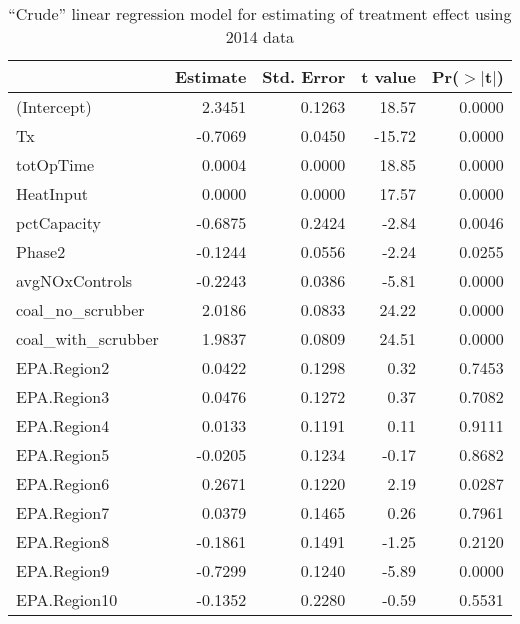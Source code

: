 \begin{table}[ht]
\centering
\begin{tabular}{lrrrr}
  \toprule
                       & Estimate & Std. Error & t value & Pr($>$$|$t$|$) \\ 
  \midrule
(Intercept)            & 2.3451   & 0.1263     & 18.57   & 0.0000         \\  \midrule
  Tx                   & -0.7069  & 0.0450     & -15.72  & 0.0000         \\  \midrule
  totOpTime            & 0.0004   & 0.0000     & 18.85   & 0.0000         \\ 
  HeatInput            & 0.0000   & 0.0000     & 17.57   & 0.0000         \\ 
  pctCapacity          & -0.6875  & 0.2424     & -2.84   & 0.0046         \\ 
  Phase2               & -0.1244  & 0.0556     & -2.24   & 0.0255         \\ 
  avgNOxControls       & -0.2243  & 0.0386     & -5.81   & 0.0000         \\ 
  coal\_no\_scrubber   & 2.0186   & 0.0833     & 24.22   & 0.0000         \\ 
  coal\_with\_scrubber & 1.9837   & 0.0809     & 24.51   & 0.0000         \\ 
  EPA.Region2          & 0.0422   & 0.1298     & 0.32    & 0.7453         \\ 
  EPA.Region3          & 0.0476   & 0.1272     & 0.37    & 0.7082         \\ 
  EPA.Region4          & 0.0133   & 0.1191     & 0.11    & 0.9111         \\ 
  EPA.Region5          & -0.0205  & 0.1234     & -0.17   & 0.8682         \\ 
  EPA.Region6          & 0.2671   & 0.1220     & 2.19    & 0.0287         \\ 
  EPA.Region7          & 0.0379   & 0.1465     & 0.26    & 0.7961         \\ 
  EPA.Region8          & -0.1861  & 0.1491     & -1.25   & 0.2120         \\ 
  EPA.Region9          & -0.7299  & 0.1240     & -5.89   & 0.0000         \\ 
  EPA.Region10         & -0.1352  & 0.2280     & -0.59   & 0.5531         \\ 
   \bottomrule
\end{tabular}
\caption{``Crude'' linear regression model for estimating of treatment
  effect using 2014 data}
\label{tab:crude-lm-14}
\end{table}

